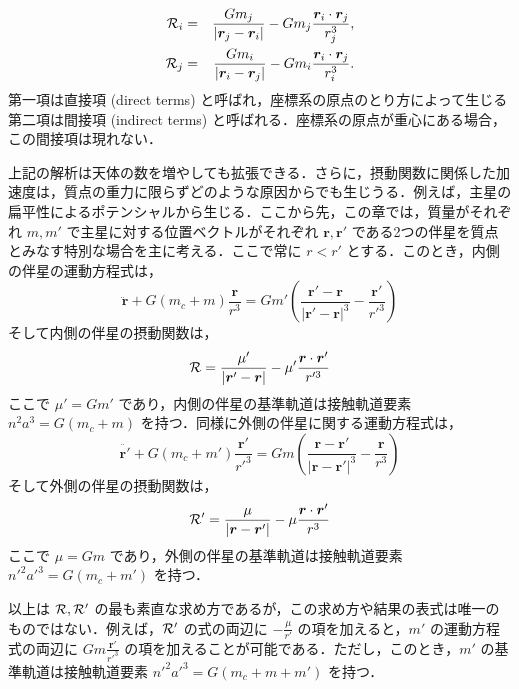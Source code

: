 \documentclass[11pt,a4paper,oneside,onecolumn]{jarticle}
\begin{document}
\begin{eqnarray}
{\cal R}_i & = & \frac{G m_j}{ |{\bm r}_j - {\bm r}_i| } - G m_j \frac{ {\bm r}_i \cdot {\bm r}_j }{r_j^3}, \\
{\cal R}_j & = & \frac{G m_i}{ |{\bm r}_i - {\bm r}_j| } - G m_i \frac{ {\bm r}_i \cdot {\bm r}_j }{r_i^3}.
\end{eqnarray}
第一項は直接項 (direct terms) と呼ばれ，座標系の原点のとり方によって生じる第二項は間接項 (indirect terms) と呼ばれる．座標系の原点が重心にある場合，この間接項は現れない．

上記の解析は天体の数を増やしても拡張できる．さらに，摂動関数に関係した加速度は，質点の重力に限らずどのような原因からでも生じうる．例えば，主星の扁平性によるポテンシャルから生じる．ここから先，この章では，質量がそれぞれ $m, m'$ で主星に対する位置ベクトルがそれぞれ ${\bm r}, {\bm r'}$ である2つの伴星を質点とみなす特別な場合を主に考える．ここで常に $r < r'$ とする．このとき，内側の伴星の運動方程式は，
\begin{equation}
\ddot{\bm r} + G (m_c + m) \frac{{\bm r}}{r^3} = G m' \left( \frac{{\bm r'} - {\bm r}}{| {\bm r'} - {\bm r} |^3} - \frac{{\bm r'}}{r'^3} \right)
\end{equation}
そして内側の伴星の摂動関数は，
\begin{equation}
{\cal R} = \frac{\mu'}{ |{\bm r'} - {\bm r}| } - \mu' \frac{ {\bm r} \cdot {\bm r'} }{r'^3} \label{eq:cal_R1}
\end{equation}
ここで $\mu' = G m'$ であり，内側の伴星の基準軌道は接触軌道要素 $n^2 a^3 = G (m_c + m)$ を持つ．同様に外側の伴星に関する運動方程式は，
\begin{equation}
\ddot{\bm r'} + G (m_c + m') \frac{{\bm r'}}{r'^3} = G m \left( \frac{{\bm r} - {\bm r'}}{| {\bm r} - {\bm r'} |^3} - \frac{{\bm r}}{r^3} \right)
\end{equation}
そして外側の伴星の摂動関数は，
\begin{equation}
{\cal R'} = \frac{\mu}{ |{\bm r} - {\bm r'}| } - \mu \frac{ {\bm r} \cdot {\bm r'} }{r^3} \label{eq:cal_R'1}
\end{equation}
ここで $\mu = G m$ であり，外側の伴星の基準軌道は接触軌道要素 $n'^2 a'^3 = G (m_c + m')$ を持つ．

以上は ${\cal R}, {\cal R'}$ の最も素直な求め方であるが，この求め方や結果の表式は唯一のものではない．例えば，${\cal R'}$ の式の両辺に $- \frac{\mu}{r'}$ の項を加えると，$m'$ の運動方程式の両辺に $G m \frac{{\bm r'}}{r'^3}$ の項を加えることが可能である．ただし，このとき，$m'$ の基準軌道は接触軌道要素 $n'^2 a'^3 = G (m_c + m + m')$ を持つ．
\end{document}
